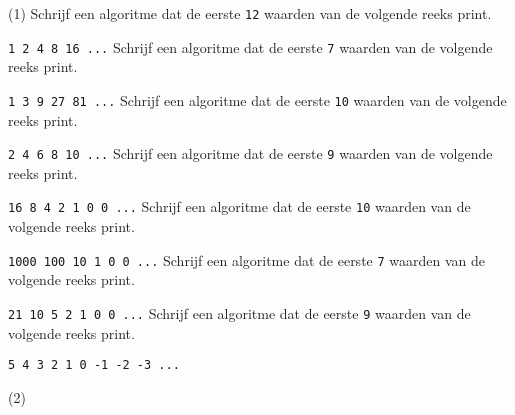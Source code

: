 \begin{exercise}
    \begin{longtasks}(1)
        \task
        Schrijf een algoritme dat de eerste \texttt{12} waarden van de volgende reeks print.

        \texttt{1 2 4 8 16 ...}
        \task
        Schrijf een algoritme dat de eerste \texttt{7} waarden van de volgende reeks print.

        \texttt{1 3 9 27 81 ...}
        \task
        Schrijf een algoritme dat de eerste \texttt{10} waarden van de volgende reeks print.

        \texttt{2 4 6 8 10 ...}
        \task
        Schrijf een algoritme dat de eerste \texttt{9} waarden van de volgende reeks print.

        \texttt{16 8 4 2 1 0 0 ...}
        \task
        Schrijf een algoritme dat de eerste \texttt{10} waarden van de volgende reeks print.

        \texttt{1000 100 10 1 0 0 ...}
        \task
        Schrijf een algoritme dat de eerste \texttt{7} waarden van de volgende reeks print.

        \texttt{21 10 5 2 1 0 0 ...}
        \task
        Schrijf een algoritme dat de eerste \texttt{9} waarden van de volgende reeks print.

        \texttt{5 4 3 2 1 0 -1 -2 -3 ...}
    \end{longtasks}
\end{exercise}

\begin{solution}
    \begin{mltasks}(2)
        \task {}
        \task {}
        \task {}
        \task {}
        \task {}
        \task {}
    \end{mltasks}
\end{solution}
